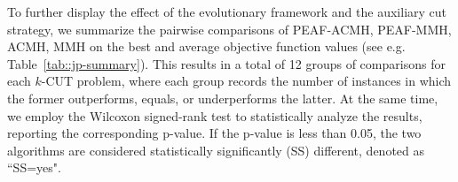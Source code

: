 \documentclass[12pt, a4paper]{article}%
\numberwithin{equation}{section}
\theoremstyle{plain}
\begin{document}
			To further display the effect of the evolutionary framework and the auxiliary cut strategy, 
			we summarize the pairwise comparisons of PEAF-ACMH, PEAF-MMH, ACMH, MMH on the best and average objective function values (see e.g. Table~\ref{tab::jp-summary}). This results in a total of 12 groups of comparisons for each $k$-CUT problem, where each group records the number of instances in which the former outperforms, equals, or underperforms the latter. At the same time, we employ the Wilcoxon signed-rank test to statistically analyze the results, reporting the corresponding p-value. If the p-value is less than 0.05, the two algorithms are considered statistically significantly (SS) different, denoted as ``SS=yes". 
			
			
\end{document}
